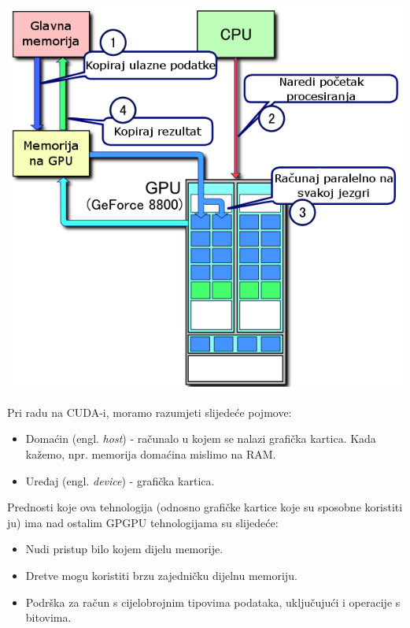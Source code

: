 \documentclass[times, utf8, zavrsni]{fer}
\begin{document}
\includegraphics[scale=0.5]{res/CUDA_processing_flow_(hr).PNG}



Pri radu na CUDA-i, moramo razumjeti slijedeće pojmove:
\begin{itemize}
\item
Domaćin (engl. \textit{host}) - računalo u kojem se nalazi grafička kartica.
Kada kažemo, npr. memorija domaćina mislimo na RAM. 

\item
Uređaj (engl. \textit{device}) - grafička kartica.

\end{itemize}

Prednosti koje ova tehnologija (odnosno grafičke kartice koje su
sposobne koristiti ju) ima nad ostalim GPGPU tehnologijama
su slijedeće:

\begin{itemize}
\item
Nudi pristup bilo kojem dijelu memorije. 

\item
Dretve mogu koristiti brzu zajedničku dijelnu memoriju. 

\item
Podrška za račun s cijelobrojnim tipovima podataka, uključujući
i operacije s bitovima.
\end{itemize}
\end{document}
